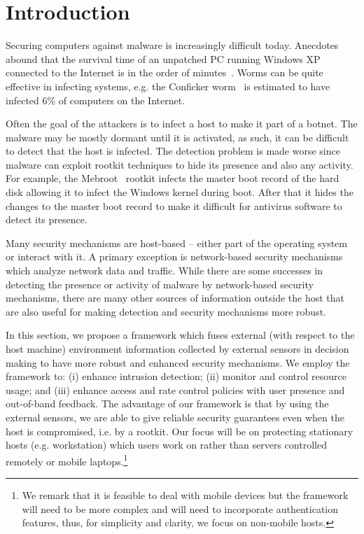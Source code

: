 \section{Introduction}
\label{sec:intro}

Securing computers against malware is increasingly difficult today. 
Anecdotes abound that the survival time
of an unpatched PC running Windows XP connected to the Internet 
is in the order of minutes~\cite{Survival1,Survival2}.
Worms can be quite effective in infecting systems, e.g.
the Conficker worm~\cite{Conficker}
is estimated to have infected 6\% of computers on the Internet.

Often the goal of the attackers is to infect a host to make it part
of a botnet.
The malware may be mostly dormant until it is activated,
as such, it can be difficult to detect that the host is infected.
The detection problem is made worse since malware can exploit rootkit
techniques to hide its presence and also any activity.
For example, the Mebroot~\cite{Mebroot} rootkit infects the master boot record of the
hard disk allowing it to infect the Windows kernel during boot.
After that it hides the changes to the master boot record to make it
difficult for antivirus software to detect its presence.

Many security mechanisms are host-based -- either
part of the operating system or interact with it.
A primary exception is network-based security mechanisms which
analyze network data and traffic.
While there are some successes in detecting the presence or activity of
malware by network-based security mechanisms, there are many other
sources of information outside the host that are also useful for
making detection and security mechanisms more robust.

In this section, we propose a framework which 
fuses external (with respect to the host machine)
environment information collected by external sensors
in decision making to have more robust and enhanced
security mechanisms.
We employ the framework to:
(i) enhance intrusion detection;
(ii) monitor and control resource usage;
and (iii) enhance access and rate control policies with
user presence and out-of-band feedback.
The advantage of our framework is that by using the external sensors,
we are able to give reliable security guarantees even when the host is
compromised, i.e. by a rootkit.
Our focus will be on protecting stationary hosts (e.g.
workstation) which users work on rather than servers controlled remotely
or mobile laptops.\footnote{
We remark that it is feasible to deal with mobile devices but the framework
will need to be more complex and will need to incorporate authentication
features, thus, for simplicity and clarity, we focus on non-mobile hosts.
}

